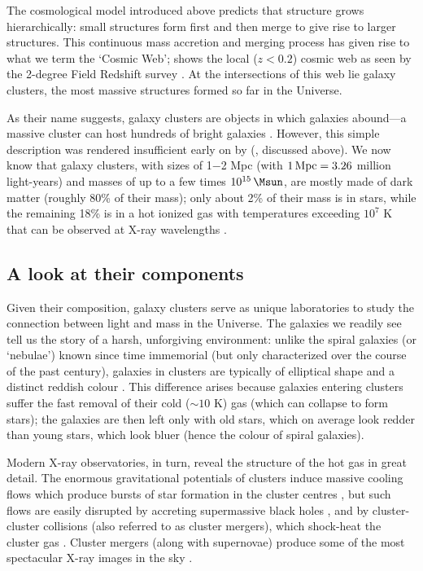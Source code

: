 The cosmological model introduced above predicts that structure grows hierarchically: small structures form first and then merge to give rise to larger structures. This continuous mass accretion and merging process has given rise to what we term the `Cosmic Web';  shows the local ($z<0.2$) cosmic web as seen by the 2-degree Field Redshift survey \citep{colless01}. At the intersections of this web lie galaxy clusters, the most massive structures formed so far in the Universe.

As their name suggests, galaxy clusters are objects in which galaxies abound---a massive cluster can host hundreds of bright galaxies \citep[e.g.,][]{abell58}. However, this simple description was rendered insufficient early on by \citeauthor{zwicky33} (\citeyear{zwicky33}, discussed above). We now know that galaxy clusters, with sizes of 1$-$2 Mpc (with $1\,{\rm Mpc}=3.26$ million light-years) and masses of up to a few times $10^{15}\,\Msun$, are mostly made of dark matter (roughly 80\% of their mass); only about 2\% of their mass is in stars, while the remaining 18\% is in a hot ionized gas with temperatures exceeding $10^7$ K that can be observed at X-ray wavelengths \citep[e.g.,][]{sarazin86}.

\subsection{A look at their components}

Given their composition, galaxy clusters serve as unique laboratories to study the connection between light and mass in the Universe. The galaxies we readily see tell us the story of a harsh, unforgiving environment: unlike the spiral galaxies (or `nebulae') known since time immemorial (but only characterized over the course of the past century), galaxies in clusters are typically of elliptical shape and a distinct reddish colour \citep{dressler80,gladders00}. This difference arises because galaxies entering clusters suffer the fast removal of their cold ($\sim10$ K) gas (which can collapse to form stars); the galaxies are then left only with old stars, which on average look redder than young stars, which look bluer (hence the colour of spiral galaxies). 

Modern X-ray observatories, in turn, reveal the structure of the hot gas in great detail. The enormous gravitational potentials of clusters induce massive cooling flows which produce bursts of star formation in the cluster centres \citep[e.g.,][]{mcdonald12}, but such flows are easily disrupted by accreting supermassive black holes \citep[which are common in galaxies in the centres of clusters; e.g.,][]{?}, and by cluster-cluster collisions (also referred to as cluster mergers), which shock-heat the cluster gas \citep{?}. Cluster mergers (along with supernovae) produce some of the most spectacular X-ray images in the sky \citep[e.g.,][]{markevitch02,menanteau12}.

